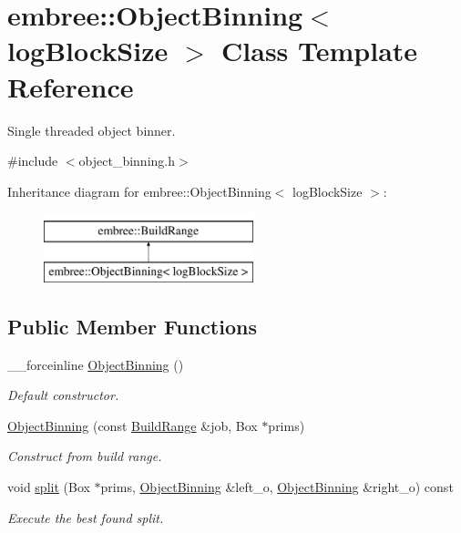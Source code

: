 \hypertarget{classembree_1_1_object_binning}{
\section{embree::ObjectBinning$<$ logBlockSize $>$ Class Template Reference}
\label{classembree_1_1_object_binning}
}


Single threaded object binner.  




{\ttfamily \#include $<$object\_\-binning.h$>$}

Inheritance diagram for embree::ObjectBinning$<$ logBlockSize $>$:\begin{figure}[H]
\begin{center}
\leavevmode
\includegraphics[height=2.000000cm]{classembree_1_1_object_binning}
\end{center}
\end{figure}
\subsection*{Public Member Functions}
\begin{DoxyCompactItemize}
\item 
\_\-\_\-forceinline \hyperlink{classembree_1_1_object_binning_a30e5010aac43e76453d4be01669dffcb}{ObjectBinning} ()
\begin{DoxyCompactList}\small\item\em Default constructor. \item\end{DoxyCompactList}\item 
\hyperlink{classembree_1_1_object_binning_ac88408313aef2246464bdf6bbb0d9fb7}{ObjectBinning} (const \hyperlink{structembree_1_1_build_range}{BuildRange} \&job, Box $\ast$prims)
\begin{DoxyCompactList}\small\item\em Construct from build range. \item\end{DoxyCompactList}\item 
void \hyperlink{classembree_1_1_object_binning_a33f5083b8e6e66e098c3efb1007fa4c2}{split} (Box $\ast$prims, \hyperlink{classembree_1_1_object_binning}{ObjectBinning} \&left\_\-o, \hyperlink{classembree_1_1_object_binning}{ObjectBinning} \&right\_\-o) const 
\begin{DoxyCompactList}\small\item\em Execute the best found split. \item\end{DoxyCompactList}\end{DoxyCompactItemize}
